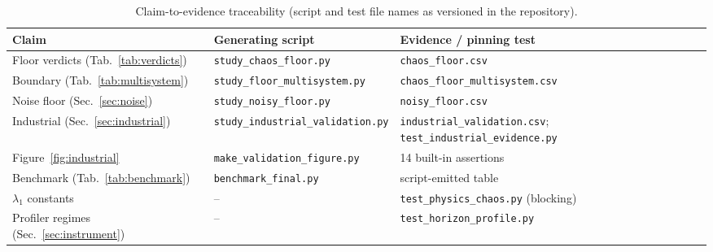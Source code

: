 \documentclass[aps,pre,twocolumn,superscriptaddress,nofootinbib,longbibliography]{revtex4-2}
\begin{document}
\begin{table}[t]
  \centering
  \begin{tabular}{l l l}
    \toprule
    Claim & Generating script & Evidence / pinning test \\
    \midrule
    Floor verdicts (Tab.~\ref{tab:verdicts}) & \texttt{study\_chaos\_floor.py}
      & \texttt{chaos\_floor.csv} \\
    Boundary (Tab.~\ref{tab:multisystem}) &
      \texttt{study\_floor\_multisystem.py}
      & \texttt{chaos\_floor\_multisystem.csv} \\
    Noise floor (Sec.~\ref{sec:noise}) & \texttt{study\_noisy\_floor.py}
      & \texttt{noisy\_floor.csv} \\
    Industrial (Sec.~\ref{sec:industrial}) &
      \texttt{study\_industrial\_validation.py}
      & \texttt{industrial\_validation.csv};
        \texttt{test\_industrial\_evidence.py} \\
    Figure~\ref{fig:industrial} &
      \texttt{make\_validation\_figure.py} & 14 built-in assertions \\
    Benchmark (Tab.~\ref{tab:benchmark}) & \texttt{benchmark\_final.py}
      & script-emitted table \\
    $\lambda_1$ constants & --
      & \texttt{test\_physics\_chaos.py} (blocking) \\
    Profiler regimes (Sec.~\ref{sec:instrument}) & --
      & \texttt{test\_horizon\_profile.py} \\
    \bottomrule
  \end{tabular}
  \caption{Claim-to-evidence traceability (script and test file names as
  versioned in the repository).}
  \label{tab:repromap}
\end{table}
\end{document}
